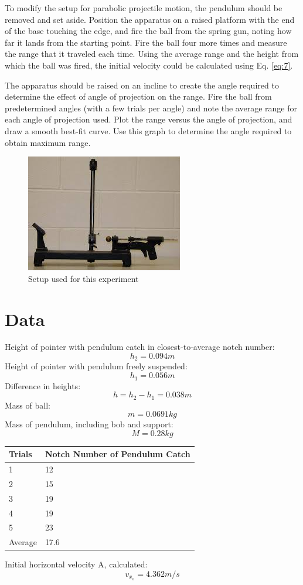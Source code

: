 \documentclass[11pt, titlepage]{article}
\begin{document}
To modify the setup for parabolic projectile motion, the pendulum should be removed and set aside. Position the apparatus on a raised platform with the end of the base touching the edge, and fire the ball from the spring gun, noting how far it lands from the starting point. Fire the ball four more times and measure the range that it traveled each time. Using the average range and the height from which the ball was fired, the initial velocity could be calculated using Eq. \ref{eq:7}.

The apparatus should be raised on an incline to create the angle required to determine the effect of angle of projection on the range. Fire the ball from predetermined angles (with a few trials per angle) and note the average range for each angle of projection used. Plot the range versus the angle of projection, and draw a smooth best-fit curve. Use this graph to determine the angle required to obtain maximum range.
\begin{figure}[!ht]
\centering
\includegraphics[scale=1.5, angle=0]{lab02.jpg}
\caption{Setup used for this experiment \label{fig:setup}}
\end{figure}

\pagebreak
\section*{Data}
Height of pointer with pendulum catch in closest-to-average notch number:
$$h_2 = 0.094 m$$
Height of pointer with pendulum freely suspended:
$$ h_1 = 0.056 m$$
Difference in heights:
$$h = h_2 - h_1 = 0.038 m$$
Mass of ball:
$$m = 0.0691 kg$$
Mass of pendulum, including bob and support:
$$M = 0.28 kg$$
\begin{center}
\begin{tabular}
{|m{7em}|m{7em}|}
\hline
Trials & Notch Number of Pendulum Catch \\
\hline
1 & 12\\
\hline
2 & 15\\
\hline
3 & 19\\
\hline
4 & 19\\
\hline
5 & 23\\
\hline
Average & 17.6\\
\hline
\end{tabular}
\end{center}
Initial horizontal velocity A, calculated:
$$v_{x_o} = 4.362 m/s$$
\end{document}
